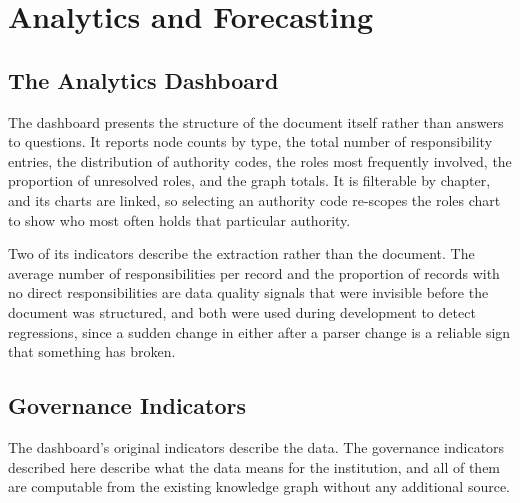 \section{Analytics and Forecasting}

\subsection{The Analytics Dashboard}

The dashboard presents the structure of the document itself rather than answers to questions. It reports node counts by type, the total number of responsibility entries, the distribution of authority codes, the roles most frequently involved, the proportion of unresolved roles, and the graph totals. It is filterable by chapter, and its charts are linked, so selecting an authority code re-scopes the roles chart to show who most often holds that particular authority.

Two of its indicators describe the extraction rather than the document. The average number of responsibilities per record and the proportion of records with no direct responsibilities are data quality signals that were invisible before the document was structured, and both were used during development to detect regressions, since a sudden change in either after a parser change is a reliable sign that something has broken.

\subsection{Governance Indicators}
\label{sec:govkpi}

The dashboard's original indicators describe the data. The governance indicators described here describe what the data means for the institution, and all of them are computable from the existing knowledge graph without any additional source.

